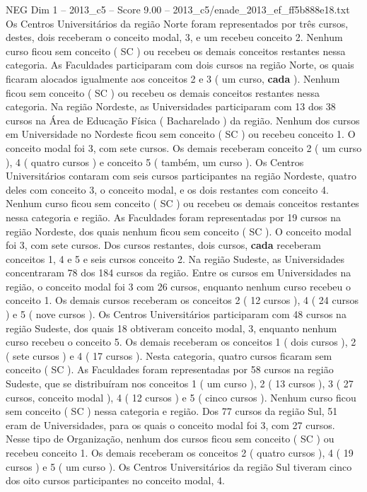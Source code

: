\begin{textsample}{NEG Dim 1 – 2013\_c5 – Score 9.00 – 2013\_c5/enade\_2013\_ef\_ff5b888e18.txt}
Os Centros Universitários da região Norte foram representados por três cursos, destes, dois receberam o conceito modal, 3, e um recebeu conceito 2.
Nenhum curso ficou sem conceito ( SC ) ou recebeu os demais conceitos restantes nessa categoria.
As Faculdades participaram com dois cursos na região Norte, os quais ficaram alocados igualmente aos conceitos 2 e 3 ( um curso, \textbf{cada} ).
Nenhum ficou sem conceito ( SC ) ou recebeu os demais conceitos restantes nessa categoria.
Na região Nordeste, as Universidades participaram com 13 dos 38 cursos na Área de Educação Física ( Bacharelado ) da região.
Nenhum dos cursos em Universidade no Nordeste ficou sem conceito ( SC ) ou recebeu conceito 1.
O conceito modal foi 3, com sete cursos.
Os demais receberam conceito 2 ( um curso ), 4 ( quatro cursos ) e conceito 5 ( também, um curso ).
Os Centros Universitários contaram com seis cursos participantes na região Nordeste, quatro deles com conceito 3, o conceito modal, e os dois restantes com conceito 4.
Nenhum curso ficou sem conceito ( SC ) ou recebeu os demais conceitos restantes nessa categoria e região.
As Faculdades foram representadas por 19 cursos na região Nordeste, dos quais nenhum ficou sem conceito ( SC ).
O conceito modal foi 3, com sete cursos.
Dos cursos restantes, dois cursos, \textbf{cada} receberam conceitos 1, 4 e 5 e seis cursos conceito 2.
Na região Sudeste, as Universidades concentraram 78 dos 184 cursos da região.
Entre os cursos em Universidades na região, o conceito modal foi 3 com 26 cursos, enquanto nenhum curso recebeu o conceito 1.
Os demais cursos receberam os conceitos 2 ( 12 cursos ), 4 ( 24 cursos ) e 5 ( nove cursos ).
Os Centros Universitários participaram com 48 cursos na região Sudeste, dos quais 18 obtiveram conceito modal, 3, enquanto nenhum curso recebeu o conceito 5.
Os demais receberam os conceitos 1 ( dois cursos ), 2 ( sete cursos ) e 4 ( 17 cursos ).
Nesta categoria, quatro cursos ficaram sem conceito ( SC ).
As Faculdades foram representadas por 58 cursos na região Sudeste, que se distribuíram nos conceitos 1 ( um curso ), 2 ( 13 cursos ), 3 ( 27 cursos, conceito modal ), 4 ( 12 cursos ) e 5 ( cinco cursos ).
Nenhum curso ficou sem conceito ( SC ) nessa categoria e região.
Dos 77 cursos da região Sul, 51 eram de Universidades, para os quais o conceito modal foi 3, com 27 cursos.
Nesse tipo de Organização, nenhum dos cursos ficou sem conceito ( SC ) ou recebeu conceito 1.
Os demais receberam os conceitos 2 ( quatro cursos ), 4 ( 19 cursos ) e 5 ( um curso ).
Os Centros Universitários da região Sul tiveram cinco dos oito cursos participantes no conceito modal, 4.

\end{textsample}

